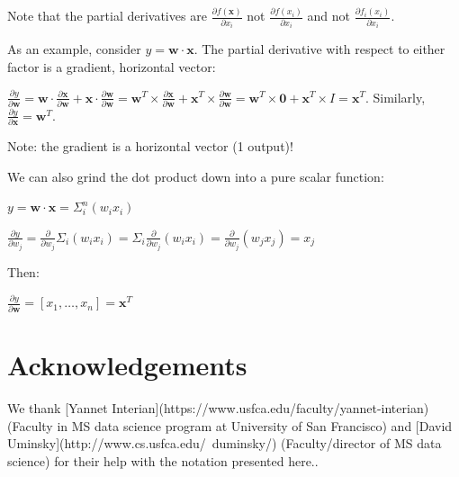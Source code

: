 \documentclass[11pt]{article}
\begin{document}
Note that the partial derivatives are $\frac{\partial f(\mathbf{x})}{\partial x_i}$ not $\frac{\partial f(x_i)}{\partial x_i}$ and not $\frac{\partial f_i(x_i)}{\partial x_i}$.

As an example, consider $y = \mathbf{w} \cdot \mathbf{x}$. The partial derivative with respect to either factor is a gradient, horizontal vector:

$\frac{\partial y}{\partial \mathbf{w}} = \mathbf{w} \cdot \frac{\partial \mathbf{x}}{\partial \mathbf{w}} + \mathbf{x} \cdot \frac{\partial \mathbf{w}}{\partial \mathbf{w}} = \mathbf{w}^T \times \frac{\partial \mathbf{x}}{\partial \mathbf{w}} + \mathbf{x}^T \times \frac{\partial \mathbf{w}}{\partial \mathbf{w}} = \mathbf{w}^T \times \mathbf{0} + \mathbf{x}^T \times I = \mathbf{x}^T$. Similarly, $\frac{\partial y}{\partial \mathbf{x}} = \mathbf{w}^T$.


Note: the gradient is a horizontal vector (1 output)!

We can also grind the dot product down into a pure scalar function:

$y = \mathbf{w} \cdot \mathbf{x} = \Sigma_i^n (w_i x_i)$

$\frac{\partial y}{\partial w_j} = \frac{\partial}{\partial w_j} \Sigma_i (w_i x_i) = \Sigma_i \frac{\partial}{\partial w_j} (w_i x_i) = \frac{\partial}{\partial w_j} (w_j x_j) = x_j$

Then:

$\frac{\partial y}{\partial \mathbf{w}} = [ x_1, \ldots, x_n ] = \mathbf{x}^T$

\section{Acknowledgements}

We thank [Yannet Interian](https://www.usfca.edu/faculty/yannet-interian) (Faculty in MS data science program at University of San Francisco) and [David Uminsky](http://www.cs.usfca.edu/~duminsky/) (Faculty/director of MS data science) for their help with the notation presented here..
\end{document}
